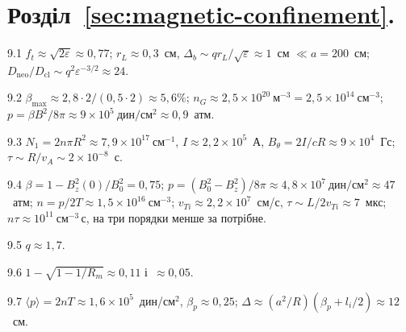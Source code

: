 \protect \section *{Розділ~\ref *{sec:magnetic-confinement}. }
\begin{Solution}{9.{1}}
		$f_t\approx\sqrt{2\varepsilon}\approx0{,}77$; $r_L\approx0{,}3$~см, $\Delta_b\sim qr_L/\sqrt\varepsilon\approx1$~см $\ll a=200$~см;
	$D_\mathrm{neo}/D_\mathrm{cl}\sim q^2\varepsilon^{-3/2}\approx24$.
	
\end{Solution}
\begin{Solution}{9.{2}}
		$\beta_{\max}\approx2{,}8\cdot2/(0{,}5\cdot2)\approx5{,}6\%$; $n_G\approx2{,}5\times10^{20}~\mathrm{м}^{-3}=2{,}5\times10^{14}~\mathrm{см}^{-3}$;
	$p=\beta B^2/8\pi\approx9\times10^5~\mathrm{дин/см^2}\approx0{,}9$~атм.
	
\end{Solution}
\begin{Solution}{9.{3}}
		$N_1=2n\pi R^2\approx7{,}9\times10^{17}~\mathrm{см}^{-1}$, $I\approx2{,}2\times10^{5}$~А,
	$B_\theta=2I/cR\approx9\times10^{4}$~Гс; $\tau\sim R/v_A\sim2\times10^{-8}$~с.
	
\end{Solution}
\begin{Solution}{9.{4}}
		$\beta=1-B_z^2(0)/B_0^2=0{,}75$; $p=(B_0^2-B_z^2)/8\pi\approx4{,}8\times10^7~\mathrm{дин/см^2}\approx47$~атм;
	$n=p/2T\approx1{,}5\times10^{16}~\mathrm{см}^{-3}$; $v_{Ti}\approx2{,}2\times10^7$~см/с, $\tau\sim L/2v_{Ti}\approx7$~мкс;
	$n\tau\approx10^{11}~\mathrm{см}^{-3}\,\mathrm{с}$, на три порядки менше за потрібне.
	
\end{Solution}
\begin{Solution}{9.{5}}
		$q\approx1{,}7$.
	
\end{Solution}
\begin{Solution}{9.{6}}
		$1-\sqrt{1-1/R_m}\approx0{,}11$ і~$\approx0{,}05$.
	
\end{Solution}
\begin{Solution}{9.{7}}
		$\langle p\rangle=2nT\approx1{,}6\times10^5$~дин/см$^2$, $\beta_p\approx0{,}25$; $\Delta\approx(a^2/R)(\beta_p+l_i/2)\approx12$~см.
	
\end{Solution}
